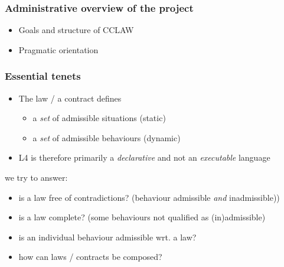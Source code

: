 \documentclass{beamer}
\begin{document}
\begin{frame}[fragile]\frametitle{Administrative overview of the project}

   
  \begin{itemize}
  \item Goals and structure of CCLAW
  \item Pragmatic orientation
  \end{itemize}

\end{frame}


\begin{frame}[fragile]\frametitle{Essential tenets}

  \begin{itemize}
  \item The law / a contract defines
    \begin{itemize}
    \item a \emph{set} of admissible situations (static)
    \item a \emph{set} of admissible behaviours (dynamic)
    \end{itemize}
  \item L4 is therefore primarily a \emph{declarative} and not an
    \emph{executable} language
  \end{itemize}
  
   we try to answer:
  \begin{itemize}
  \item is a law free of contradictions? (behaviour admissible \emph{and} inadmissible))
  \item is a law complete? (some behaviours not qualified as (in)admissible)
  \item is an individual behaviour admissible wrt. a law?
  \item how can laws / contracts be composed?
  \end{itemize}


\end{frame}
\end{document}

